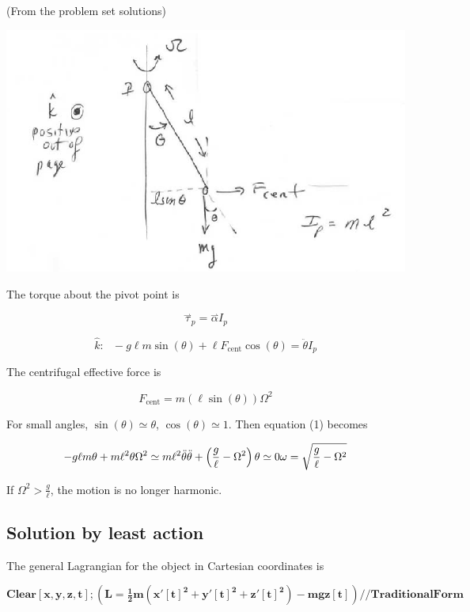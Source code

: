 \documentclass{article}
\begin{document}
(From the problem set solutions)

\includegraphics{Principle of Least Action_gr3.eps}

The torque about the pivot point is

\[\overset{\rightharpoonup }{\tau }_p=\overset{\rightharpoonup }{\alpha } I_p\]

\begin{equation}
\hat{k}:\text{         }-g \ell  m \sin (\theta )+\ell  F_{\text{cent}} \cos (\theta )=\ddot{\theta } I_p
\end{equation}

The centrifugal effective force is

\[F_{\text{cent}}=m (\ell  \sin (\theta ))\Omega ^2\]

For small angles, \(\sin (\theta )\simeq \theta\), \(\cos (\theta )\simeq 1\). { }Then equation (1) becomes

\[-g \ell  m \theta +m \ell ^2 \theta  \Omega ^2\simeq m \ell ^2\ddot{\theta } \\
\\
\ddot{\theta } +\left(\frac{g}{\ell }- \Omega ^2\right)\theta \simeq 0\\
\\
\omega =\sqrt{\frac{g}{\ell }-\Omega ^2}\]

If \(\Omega ^2>\frac{g}{\ell }\), the motion is no longer harmonic.

\subsection*{Solution by least action}

The general Lagrangian for the object in Cartesian coordinates is

\begin{doublespace}
\noindent\(\pmb{\text{Clear}[x,y,z,t];\left(L=\frac{1}{2}m\left(x'[t]^2+y'[t]^2+z'[t]^2\right)-m g z[t]\right)\text{//}\text{TraditionalForm}}\)
\end{doublespace}
\end{document}

